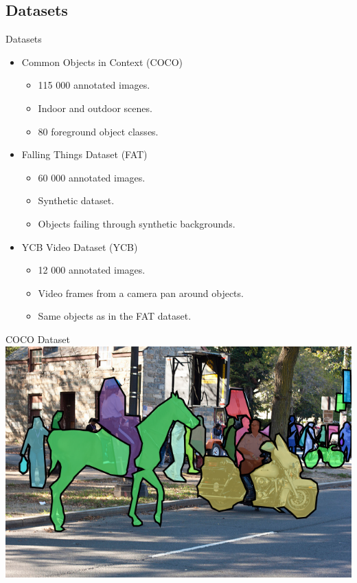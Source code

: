 \documentclass[18pt]{beamer}
\begin{document}
\subsection{Datasets}

\begin{frame}{Datasets}
\begin{itemize}
    \item Common Objects in Context (COCO)
    \begin{itemize}
        \item 115 000 annotated images.
        \item Indoor and outdoor scenes.
        \item 80 foreground object classes.
    \end{itemize}
    \item Falling Things Dataset (FAT)
    \begin{itemize}
        \item 60 000 annotated images.
        \item Synthetic dataset.
        \item Objects failing through synthetic backgrounds.
    \end{itemize}
    \item YCB Video Dataset (YCB)
    \begin{itemize}
        \item 12 000 annotated images.
        \item Video frames from a camera pan around objects.
        \item Same objects as in the FAT dataset.
    \end{itemize}
\end{itemize}
\end{frame}

\begin{frame}{COCO Dataset}
\centering
\includegraphics[height=0.8\textheight]{figures/coco_example_outdoor.png}
\end{frame}
\end{document}
